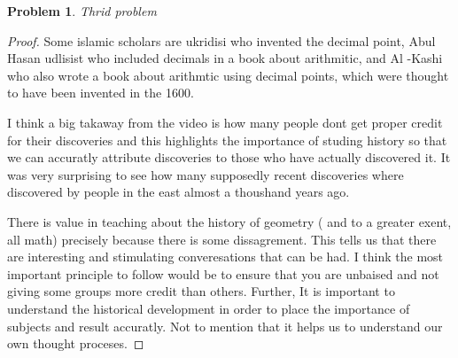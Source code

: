 \documentclass{article}
\newtheorem{prb}{Problem}
\begin{document}
\begin{prb}Thrid problem  \end{prb} 
\begin{proof} 
	
	Some islamic scholars are 
	ukridisi who invented the decimal 
	point, Abul Hasan udlisist who 
	included decimals in a book about 
	arithmitic, and Al -Kashi who also 
	wrote a book about arithmtic using 
	decimal points, which were thought 
	to have been invented in the 1600.

	\medskip 
	I think a big takaway from the 
	video is how many people dont get 
	proper credit for their discoveries 
	and this highlights the importance 
	of studing history so that we can 
	accuratly attribute discoveries to those who have actually discovered it. It was 
	very surprising to see how many supposedly recent discoveries where discovered by 
	people in the east almost a thoushand years ago. 



	\medskip 
	There is value in teaching about 
	the history of geometry (
	and to a greater exent, all math) 
	precisely because there is some 
	dissagrement. This tells us that 
	there are interesting and stimulating
	converesations that can be had. 
	I think the most important 
	principle to follow would 
	be to ensure that you 
	are unbaised and not giving 
	some groups more credit than 
	others. Further, 
	It is important to understand the 
	historical development in order to 
	place the importance of subjects and 
	result accuratly. Not to mention that 
	it helps us to understand our own thought proceses. 

\end{proof} 
\end{document}
